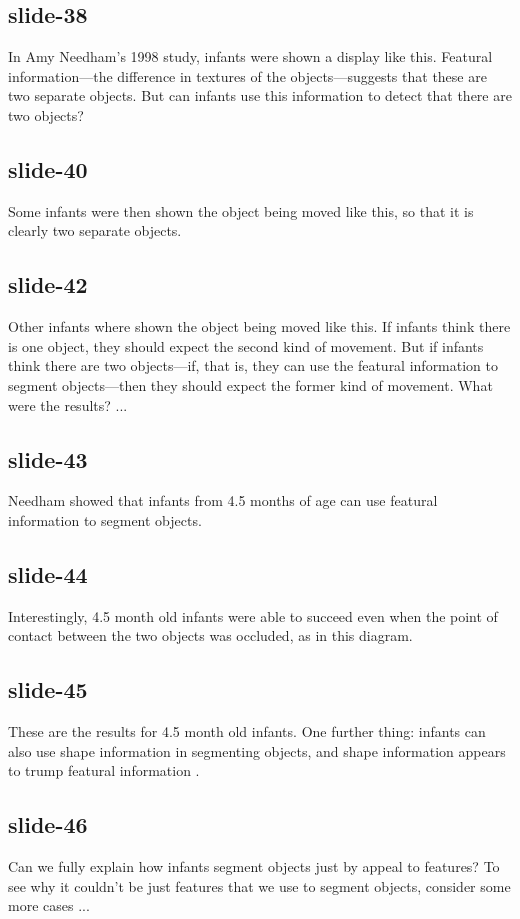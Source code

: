 \documentclass[12pt,\papersize]{extarticle}
\begin{document}
 
\subsection{slide-38}
In Amy Needham's 1998 study, infants were shown a display like this.
Featural information---the difference in textures of the objects---suggests that these are two separate objects.
But can infants use this information to detect that there are two objects?
 
 
\subsection{slide-40}
Some infants were then shown the object being moved like this, so that it is clearly two separate objects.
 
 
\subsection{slide-42}
Other infants where shown the object being moved like this.
If infants think there is one object, they should expect the second kind of movement.
But if infants think there are two objects---if, that is, they can use the featural information to segment objects---then they should expect the former kind of movement.
What were the results? ...
 
 
\subsection{slide-43}
Needham showed that infants from 4.5 months of age can use featural information to segment objects.
 
 
\subsection{slide-44}
Interestingly, 4.5 month old infants were able to succeed even when the point of contact between the two objects was occluded, as in this diagram.
 
 
\subsection{slide-45}
These are the results for 4.5 month old infants.
One further thing: infants can also use shape information in segmenting objects, and shape information appears to trump featural information \citep{needham:1999_role}.
 
 
\subsection{slide-46}
Can we fully explain how infants segment objects just by appeal to features? To see why it couldn't be just features that we use to segment objects, consider some more cases ...
 
\end{document}

